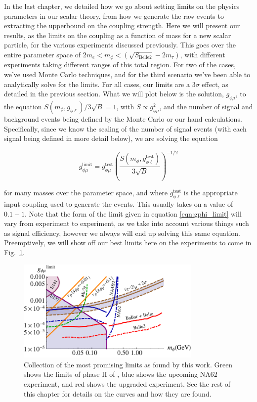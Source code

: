 \label{chapter:results}

In the last chapter, we detailed how we go about setting limits on the physics parameters in our scalar theory, from how we generate the raw events to extracting the upperbound on the coupling strength.
Here we will present our results, as the limits on the coupling as a function of mass for a new scalar particle, for the various experiments discussed previously.
This goes over the entire parameter space of $2m_e < m_\phi < (\sqrt{S_\textrm{Belle2}} - 2m_\tau)$, with different experiments taking different ranges of this total region.
For two of the cases, we've used \madgraph Monte Carlo techniques, and for the third scenario we've been able to analytically solve for the limits.
For all cases, our limits are a $3\sigma$ effect, as detailed in the previous section.
What we will plot below is the solution, $g_{\phi\mu}$, to the equation $S(m_\phi,g_{\phi\ell})/3\sqrt{B} = 1$, with $S \propto g_{\phi\mu}^2$, and the number of signal and background events being defined by the Monte Carlo or our hand calculations.
Specifically, since we know the scaling of the number of signal events (with each signal being defined in more detail below), we are solving the equation

\begin{equation}
\label{eqn:gphi_limit}
g_{\phi\mu}^\textrm{limit} = g_{\phi\mu}^\textrm{test} \left( \frac{S(m_\phi,g_{\phi\ell}^\textrm{test})}{3\sqrt{B}} \right)^{-1/2}
\end{equation}

\noindent for many masses over the parameter space, and where $g_{\phi\ell}^\textrm{test}$ is the appropriate input coupling used to generate the events.
This usually takes on a value of $0.1 - 1$.
Note that the form of the limit given in equation \ref{eqn:gphi_limit} will vary from experiment to experiment, as we take into account various things such as signal efficiency, however we always will end up solving this same equation.
Preemptively, we will show off our best limits here on the experiments to come in Fig.~\ref{fig:best_limits}.

\begin{figure}[h]
    \centering
    \includegraphics[width=0.8\textwidth]{Figures/limits/best_limits}
    \caption{Collection of the most promising limits as found by this work. Green shows the limits of phase II of \mueee, blue shows the upcoming NA62 experiment, and red shows the upgraded \belletwo experiment. See the rest of this chapter for details on the curves and how they are found.}
    \label{fig:best_limits}
\end{figure}




